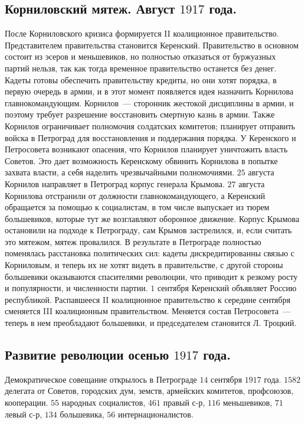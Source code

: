 \documentclass[12pt]{article}
\begin{document}
	\subsection{Корниловский мятеж. Август $1917$ года.}
	После Корниловского кризиса формируется II коалиционное правительство. Представителем правительства становится Керенский. Правительство в основном состоит из эсеров и меньшевиков, но полностью отказаться от буржуазных партий нельзя, так как тогда временное правительство останется без денег. Кадеты готовы обеспечить правительству кредиты, но они хотят порядка, в первую очередь в армии, и в этот момент появляется идея назначить Корнилова главнокомандующим. Корнилов~--- сторонник жестокой дисциплины в армии, и поэтому требует разрешение восстановить смертную казнь в армии. Также Корнилов ограничивает полномочия солдатских комитетов; планирует отправить войска в Петроград для восстановления и поддержания порядка. У Керенского и Петросовета возникают опасения, что Корнилов планирует уничтожить власть Советов. Это дает возможность Керенскому обвинить Корнилова в попытке захвата власти, а себя наделить чрезвычайными полномочиями. $25$ августа Корнилов направляет в Петроград корпус генерала Крымова. $27$ августа Корнилова отстранили от должности главнокомандующего, а Керенский обращается за помощью к социалистам, в том числе выпускает из тюрем большевиков, которые тут же возглавляют оборонное движение. Корпус Крымова остановили на подходе к Петрограду, сам Крымов застрелился, и, если считать это мятежом, мятеж провалился. В результате в Петрограде полностью поменялась расстановка политических сил: кадеты дискредитированны связью с Корниловым, и теперь их не хотят видеть в правительстве, с другой стороны большевики оказываются спасителями революции, что приводит к резкому росту и популярности, и численности партии. $1$ сентября Керенский объявляет Россию республикой. Распавшееся II коалиционное правительство к середине сентября сменяется III коалиционным правительством. Меняется состав Петросовета~--- теперь в нем преобладают большевики, и председателем становится Л. Троцкий.
	\subsection{Развитие революции осенью $1917$ года.}
	Демократическое совещание открылось в Петрограде $14$ сентября $1917$ года. $1582$ делегата от Советов, городских дум, земств, армейских комитетов, профсоюзов, кооперации. $55$ народных социалистов, $461$ правый с-р, $116$ меньшевиков, $71$ левый с-р, $134$ большевика, $56$ интернационалистов.
\end{document}
